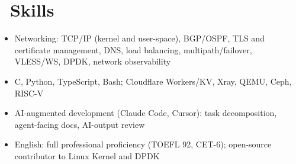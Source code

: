 \documentclass{resume}
\begin{document}
\section{\faWrench\ Skills}
\begin{itemize}[parsep=0.5ex]
  \item Networking: TCP/IP (kernel and user-space), BGP/OSPF, TLS and certificate management, DNS, load balancing, multipath/failover, VLESS/WS, DPDK, network observability
  \item C, Python, TypeScript, Bash; Cloudflare Workers/KV, Xray, QEMU, Ceph, RISC-V
  \item AI-augmented development (Claude Code, Cursor): task decomposition, agent-facing docs, AI-output review
  \item English: full professional proficiency (TOEFL 92, CET-6); open-source contributor to Linux Kernel and DPDK
\end{itemize}
\end{document}
